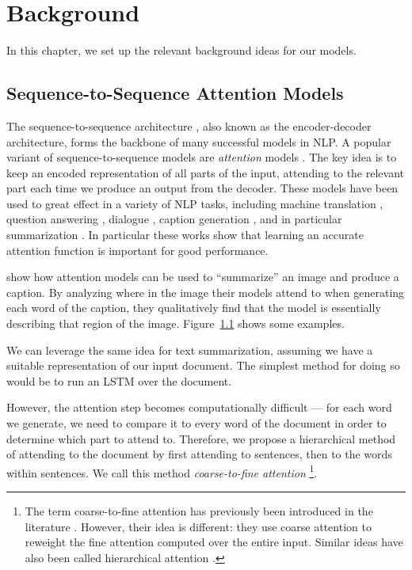 \documentclass[11pt]{report}
\begin{document}
\chapter{Background}

In this chapter, we set up the relevant background ideas for our models.

\section{Sequence-to-Sequence Attention Models}

The sequence-to-sequence architecture \citep{sutskever2014sequence}, also known as the encoder-decoder architecture, forms the backbone of many successful models in NLP. A popular variant of sequence-to-sequence models are \emph{attention} models \citep{bahdanau2014neural}. The key idea is to keep an encoded representation of all parts of the input, attending to the relevant part each time we produce an output from the decoder.
These models have been used to great effect in a variety of NLP tasks, including machine translation \citep{sutskever2014sequence, bahdanau2014neural}, question answering \citep{Hermann2015}, dialogue \citep{li2016persona}, caption generation \citep{xu2015captioning}, and in particular summarization \citep{rush2015neural}. In particular these works show that learning an accurate attention function is important for good performance. %

\citet{xu2015captioning} show how attention models can be used to ``summarize'' an image and produce a caption. 
By analyzing where in the image their models attend to when generating each word of the caption, they qualitatively find that the model is essentially describing that region of the image. 
Figure~\ref{} shows some examples.


We can leverage the same idea for text summarization, assuming we have a suitable representation of our input document. The simplest method for doing so would be to run an LSTM over the document.

However, the attention step becomes computationally difficult --- for each word we generate, we need to compare it to every word of the document in order to determine which part to attend to. Therefore, we propose a hierarchical method of attending to the document by first attending to sentences, then to the words within sentences. We call this method \emph{coarse-to-fine attention}
\footnote{The term coarse-to-fine attention has previously been introduced in the literature \citep{mei2016}. However, their idea is different: they use coarse attention to reweight the fine attention computed over the entire input. Similar ideas have also been called hierarchical attention \citep{nallapati2016seq2seq}.}.
\end{document}
